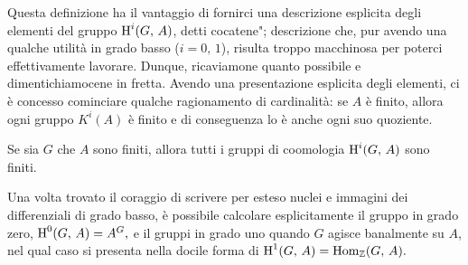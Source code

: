 Questa definizione ha il vantaggio di fornirci una descrizione esplicita degli elementi del gruppo $ \operatorname{H}^i(G, \, A) $, detti \leftquote cocatene"; descrizione che, pur avendo una qualche utilità in grado basso ($ i = 0,\, 1 $), risulta troppo macchinosa per poterci effettivamente lavorare. Dunque, ricaviamone quanto possibile e dimentichiamocene in fretta. Avendo una presentazione esplicita degli elementi, ci è concesso cominciare qualche ragionamento di cardinalità: se $ A $ è finito, allora ogni gruppo $ K^i(A) $ è finito e di conseguenza lo è anche ogni suo quoziente.
\begin{lemma}%
	Se sia $ G $ che $ A $ sono finiti, allora tutti i gruppi di coomologia $ \operatorname{H}^i(G, \, A) $ sono finiti.
\end{lemma}
Una volta trovato il coraggio di scrivere per esteso nuclei e immagini dei differenziali di grado basso, è possibile calcolare esplicitamente il gruppo in grado zero, $ \operatorname{H}^0(G, \, A) = A^G, $ e il gruppi in grado uno quando $ G $ agisce banalmente su $ A $, nel qual caso si presenta nella docile forma di $ \operatorname{H}^1(G, \, A) = \operatorname{Hom}_{\mathbb{Z}}(G, \, A). $


